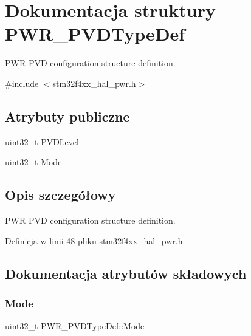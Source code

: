 \hypertarget{struct_p_w_r___p_v_d_type_def}{}\section{Dokumentacja struktury P\+W\+R\+\_\+\+P\+V\+D\+Type\+Def}
\label{struct_p_w_r___p_v_d_type_def}


P\+WR P\+VD configuration structure definition.  




{\ttfamily \#include $<$stm32f4xx\+\_\+hal\+\_\+pwr.\+h$>$}

\subsection*{Atrybuty publiczne}
\begin{DoxyCompactItemize}
\item 
uint32\+\_\+t \hyperlink{struct_p_w_r___p_v_d_type_def_a540471bc6ac947fd8bc2c87f61d9faab}{P\+V\+D\+Level}
\item 
uint32\+\_\+t \hyperlink{struct_p_w_r___p_v_d_type_def_af692d691f0cb5871b319fd371fab34d8}{Mode}
\end{DoxyCompactItemize}


\subsection{Opis szczegółowy}
P\+WR P\+VD configuration structure definition. 

Definicja w linii 48 pliku stm32f4xx\+\_\+hal\+\_\+pwr.\+h.



\subsection{Dokumentacja atrybutów składowych}
\mbox{\label{struct_p_w_r___p_v_d_type_def_af692d691f0cb5871b319fd371fab34d8}} 
\subsubsection{\texorpdfstring{Mode}{Mode}}
{\footnotesize\ttfamily uint32\+\_\+t P\+W\+R\+\_\+\+P\+V\+D\+Type\+Def\+::\+Mode}

